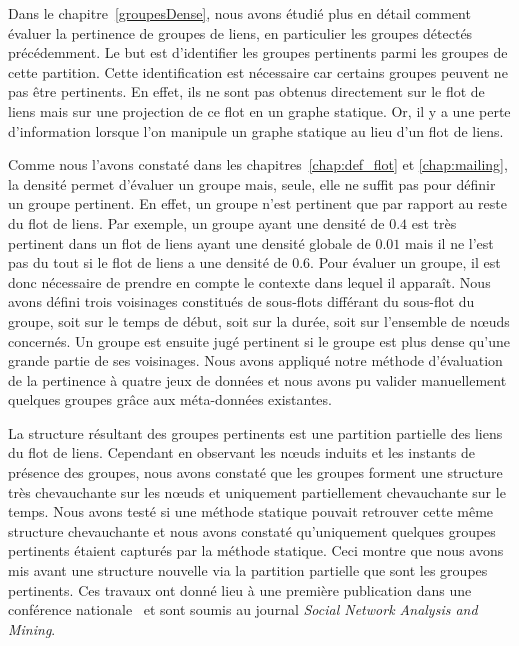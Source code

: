 \bigskip

Dans le chapitre~\ref{groupesDense}, nous avons étudié plus en détail comment évaluer la pertinence de groupes de liens, en particulier les groupes détectés précédemment.
Le but est d'identifier les groupes pertinents parmi les groupes de cette partition.
Cette identification est nécessaire car certains groupes peuvent ne pas être pertinents.
En effet, ils ne sont pas obtenus directement sur le flot de liens mais sur une projection de ce flot en un graphe statique.
Or, il y a une perte d'information lorsque l'on manipule un graphe statique au lieu d'un flot de liens.

Comme nous l'avons constaté dans les chapitres~\ref{chap:def_flot} et \ref{chap:mailing}, la densité permet d'évaluer un groupe mais, seule, elle ne suffit pas pour définir un groupe pertinent.
En effet, un groupe n'est pertinent que par rapport au reste du flot de liens.
Par exemple, un groupe ayant une densité de $0.4$ est très pertinent dans un flot de liens ayant une densité globale de $0.01$ mais il ne l'est pas du tout si le flot de liens a une densité de $0.6$.
Pour évaluer un groupe, il est donc nécessaire de prendre en compte le contexte dans lequel il apparaît.
Nous avons défini trois voisinages constitués de sous-flots différant du sous-flot du groupe, soit sur le temps de début, soit sur la durée, soit sur l'ensemble de n\oe{}uds concernés.
Un groupe est ensuite jugé pertinent si le groupe est plus dense qu'une grande partie de ses voisinages.
Nous avons appliqué notre méthode d'évaluation de la pertinence à quatre jeux de données et nous avons pu valider manuellement quelques groupes grâce aux méta-données existantes.

La structure résultant des groupes pertinents est une partition partielle des liens du flot de liens.
Cependant en observant les n\oe{}uds induits et les instants de présence des groupes, nous avons constaté que les groupes forment une structure très chevauchante sur les n\oe{}uds et uniquement partiellement chevauchante sur le temps.
Nous avons testé si une méthode statique pouvait retrouver cette même structure chevauchante et nous avons constaté qu'uniquement quelques groupes pertinents étaient capturés par la méthode statique.
Ceci montre que nous avons mis avant une structure nouvelle via la partition partielle que sont les groupes pertinents.
Ces travaux ont donné lieu à une première publication dans une conférence nationale~\cite{gaumont:hal-01305118} et sont soumis au journal \emph{Social Network Analysis and Mining}.


